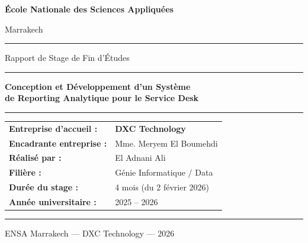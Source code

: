 \documentclass[12pt, a4paper]{report}
\begin{document}
\begin{titlepage}
  \centering

  \vspace*{1cm}
  {\Large \textbf{École Nationale des Sciences Appliquées}\par}
  {\large Marrakech\par}
  \vspace{0.3cm}
  \textcolor{dxcgrey}{\rule{\linewidth}{0.4pt}}
  \vspace{0.5cm}

  {\large Rapport de Stage de Fin d'Études\par}
  \vspace{1.5cm}

  {\color{dxcpurple}\rule{\linewidth}{1.5pt}}\vspace{0.4cm}
  {\LARGE \textbf{Conception et Développement d'un Système\\[0.4em]
  de Reporting Analytique pour le Service Desk}\par}
  \vspace{0.3cm}
  {\color{dxcpurple}\rule{\linewidth}{1.5pt}}

  \vspace{1.5cm}

  \begin{tabular}{ll}
    \textbf{Entreprise d'accueil :} & \textbf{DXC Technology} \\[0.4em]
    \textbf{Encadrante entreprise :} & Mme. Meryem El Boumehdi \\[0.4em]
    \textbf{Réalisé par :} & El Adnani Ali \\[0.4em]
    \textbf{Filière :} & Génie Informatique / Data \\[0.4em]
    \textbf{Durée du stage :} & 4 mois (du 2 février 2026) \\[0.4em]
    \textbf{Année universitaire :} & 2025 -- 2026 \\
  \end{tabular}

  \vfill

  \textcolor{dxcgrey}{\rule{\linewidth}{0.4pt}}\vspace{0.3cm}
  {\small\textcolor{dxcgrey}{ENSA Marrakech --- DXC Technology --- 2026}\par}

\end{titlepage}
\end{document}
